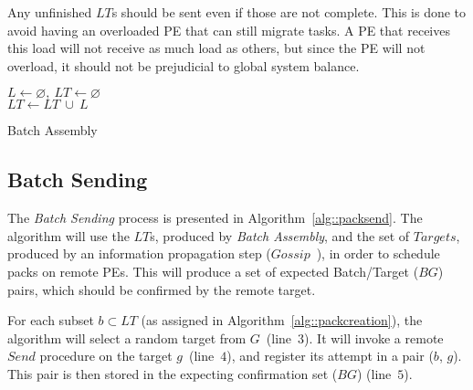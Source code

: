 Any unfinished $LT$s should be sent even if those are not complete.
This is done to avoid having an overloaded PE that can still migrate tasks.
A PE that receives this load will not receive as much load as others, but since the PE will not overload, it should not be prejudicial to global system balance.

\begin{algorithm}[!ht]
    \DontPrintSemicolon
    $L \gets \varnothing,\ LT \gets \varnothing$ \\
    $LT \gets LT\ \cup\ L$   
    \caption{Batch Assembly} 
    \label{alg::packcreation}
\end{algorithm}
\vspace{-20pt}

\subsection{Batch Sending} \label{sec:algo:sending}

The \textit{Batch Sending} process is presented in Algorithm~\ref{alg::packsend}.
The algorithm will use the $LT$s, produced by \textit{Batch Assembly}, and the set of $Targets$, produced by an information propagation step ($Gossip$~\cite{gossip}), in order to schedule packs on remote PEs.
This will produce a set of expected Batch/Target ($BG$) pairs, which should be confirmed by the remote target.

For each subset $b \subset LT$ (as assigned in Algorithm~\ref{alg::packcreation}), the algorithm will select a random target from $G$~(line~$3$).
It will invoke a remote $Send$ procedure on the target $g$~(line~$4$), and register its attempt in a pair ($b$, $g$).
This pair is then stored in the expecting confirmation set ($BG$) (line~$5$).

